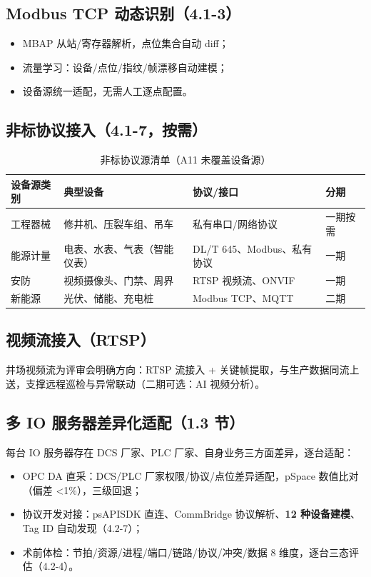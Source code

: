 \documentclass[11pt,a4paper]{ctexart}
\begin{document}
\subsection{Modbus TCP 动态识别（4.1-3）}

\begin{itemize}[leftmargin=*]
  \item MBAP 从站/寄存器解析，点位集合自动 diff；
  \item 流量学习：设备/点位/指纹/帧漂移自动建模；
  \item 设备源统一适配，无需人工逐点配置。
\end{itemize}

\subsection{非标协议接入（4.1-7，按需）}

\begin{longtable}{p{3.2cm} p{4.2cm} p{3.6cm} p{2.4cm}}
\caption{非标协议源清单（A11 未覆盖设备源）}\\
\toprule
\textbf{设备源类别} & \textbf{典型设备} & \textbf{协议/接口} & \textbf{分期} \\
\midrule
工程器械 & 修井机、压裂车组、吊车 & 私有串口/网络协议 & 一期按需 \\
能源计量 & 电表、水表、气表（智能仪表） & DL/T 645、Modbus、私有协议 & 一期 \\
安防 & 视频摄像头、门禁、周界 & RTSP 视频流、ONVIF & 一期 \\
新能源 & 光伏、储能、充电桩 & Modbus TCP、MQTT & 二期 \\
\bottomrule
\end{longtable}

\subsection{视频流接入（RTSP）}

井场视频流为评审会明确方向：RTSP 流接入 + 关键帧提取，与生产数据同流上送，支撑远程巡检与异常联动（二期可选：AI 视频分析）。

\subsection{多 IO 服务器差异化适配（1.3 节）}

每台 IO 服务器存在 DCS 厂家、PLC 厂家、自身业务三方面差异，逐台适配：
\begin{itemize}[leftmargin=*]
  \item OPC DA 直采：DCS/PLC 厂家权限/协议/点位差异适配，pSpace 数值比对（偏差 <1\%），三级回退；
  \item 协议开发对接：psAPISDK 直连、CommBridge 协议解析、\textbf{12 种设备建模}、Tag ID 自动发现（4.2-7）；
  \item 术前体检：节拍/资源/进程/端口/链路/协议/冲突/数据 8 维度，逐台三态评估（4.2-4）。
\end{itemize}
\end{document}
